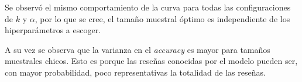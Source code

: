 %
Se observó el mismo comportamiento de la curva para todas las configuraciones
de $k$ y $\alpha$, por lo que se cree, el tamaño muestral óptimo es
independiente de los hiperparámetros a escoger.

%
A su vez se observa que la varianza en el \textit{accuracy} es mayor para
tamaños muestrales chicos. Esto es porque las reseñas conocidas por el modelo
pueden ser, con mayor probabilidad, poco representativas la totalidad de las
reseñas.
